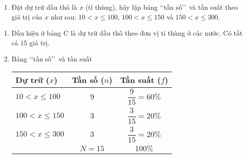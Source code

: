 \begin{bt}
\begin{enumerate}
		\item Đặt dự trữ dầu thô là $x$ (tỉ thùng), hãy lập bảng \lq\lq tần số\rq\rq\ và tần suất theo giá trị của $x$ như sau: $10<x\le 100$, $100<x\le 150$ và $150<x\le 300$.
	\end{enumerate}
	\loigiai
	{
		\begin{enumerate}
			\item Dấu hiệu ở bảng C là dự trữ dầu thô theo đơn vị tỉ thùng ở các nước. Có tất cả $15$ giá trị.
			\item Bảng \lq\lq tần số\rq\rq\ và tần suất
			\begin{center}
				\begin{tabular}{|l|c|c|}
					\hline
					Dự trữ ($x$) &Tần số ($n$) &Tần suất ($f$)\\
					\hline
					$10<x\le 100$ &$9$ &$\dfrac{9}{15}=60\%$\\
					\hline
					$100<x\le 150$ &$3$ &$\dfrac{3}{15}=20\%$\\
					\hline
					$150<x\le 300$ &$3$ &$\dfrac{3}{15}=20\%$\\
					\hline
					&$N=15$ &$100\%$\\
					\hline
				\end{tabular}
			\end{center}
		\end{enumerate}
	}
\end{bt}

